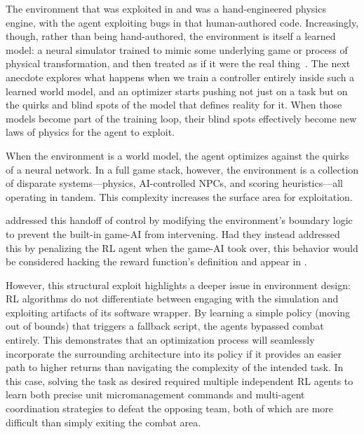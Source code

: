 \documentclass[10pt]{article}
\def\citep#1{}%
\def\citet#1{}%
\begin{document}
The environment that was exploited in  and  was a hand-engineered physics engine, with the agent exploiting bugs in that human-authored code.
Increasingly, though, rather than being hand-authored, the environment is itself a learned model: a neural simulator trained to mimic some underlying game or process of physical transformation, and then treated as if it were the real thing~\citep{ha2018world, bruce2024genie, hafner2024masteringdiversedomainsworld, parkerholder2024genie2}.
The next anecdote explores what happens when we train a controller entirely inside such a learned world model, and an optimizer starts pushing not just on a task but on the quirks and blind spots of the model that defines reality for it.
When those models become part of the training loop, their blind spots effectively become new laws of physics for the agent to exploit.




When the environment is a world model, the agent optimizes against the quirks of a neural network. 
In a full game stack, however, the environment is a collection of disparate systems---physics, AI-controlled NPCs, and scoring heuristics---all operating in tandem. 
This complexity increases the surface area for exploitation. 



\citet{samvelyan2019starcraftmultiagentchallenge} addressed this handoff of control by modifying the environment's boundary logic to prevent the built-in game-AI from intervening.
Had they instead addressed this by penalizing the RL agent when the game-AI took over, this behavior would be considered hacking the reward function's definition and appear in .

However, this structural exploit highlights a deeper issue in environment design: RL algorithms do not differentiate between engaging with the simulation and exploiting artifacts of its software wrapper.
By learning a simple policy (moving out of bounds) that triggers a fallback script, the agents bypassed combat entirely.
This demonstrates that an optimization process will seamlessly incorporate the surrounding architecture into its policy if it provides an easier path to higher returns than navigating the complexity of the intended task.
In this case, solving the task as desired required multiple independent RL agents to learn both precise unit micromanagement commands and multi-agent coordination strategies to defeat the opposing team, both of which are more difficult than simply exiting the combat area.
\end{document}
